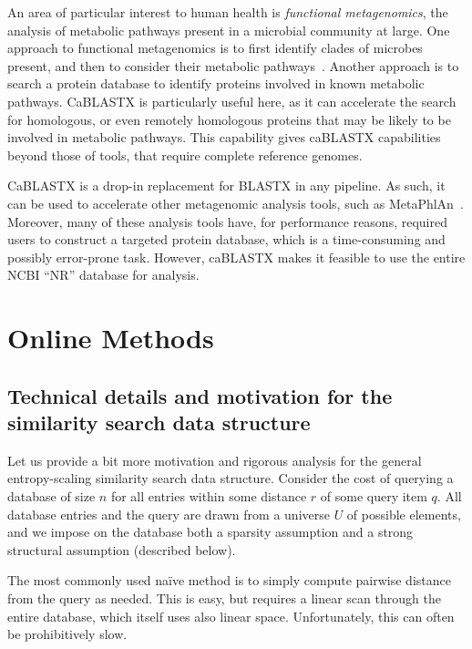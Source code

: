 \documentclass{amsbook}
\theoremstyle{definition}
\theoremstyle{remark}
\numberwithin{equation}{section}
\begin{document}
An area of particular interest to human health is \emph{functional 
metagenomics}, the analysis of metabolic pathways present in a microbial
community at large.
One approach to functional metagenomics is to first identify clades of
microbes present, and then to consider their metabolic pathways~\cite{blah}.
Another approach is to search a protein database to identify proteins involved
in known metabolic pathways.
CaBLASTX is particularly useful here, as it can accelerate the search for
homologous, or even remotely homologous proteins that may be likely to be
involved in metabolic pathways.
This capability gives caBLASTX capabilities beyond those of tools, that require
complete reference genomes.

CaBLASTX is a drop-in replacement for BLASTX in any pipeline.
As such, it can be used to accelerate other metagenomic analysis tools, such
as MetaPhlAn~\cite{blah}.
Moreover, many of these analysis tools have, for performance reasons, required
users to construct a targeted protein database, which is a time-consuming and
possibly error-prone task.
However, caBLASTX makes it feasible to use the entire NCBI ``NR'' database for
analysis.

\chapter{Online Methods}

\section{Technical details and motivation for the similarity search data structure}
Let us provide a bit more motivation and rigorous analysis for the general entropy-scaling similarity search data structure.
Consider the cost of querying a database of size $n$ for all entries within some distance $r$ of some query item $q$.
All database entries and the query are drawn from a universe $U$ of possible elements, and we impose on the database both a sparsity assumption and a strong structural assumption (described below).

The most commonly used na\"ive method is to simply compute pairwise distance from the query as needed.
This is easy, but requires a linear scan through the entire database, which itself uses also linear space.
Unfortunately, this can often be prohibitively slow.
\end{document}
